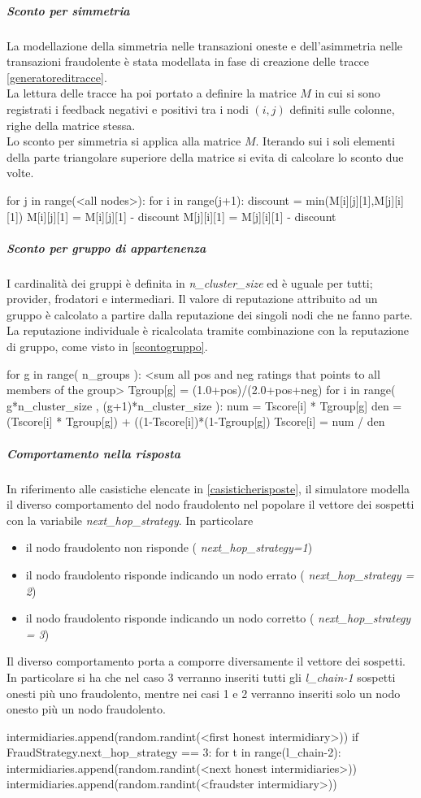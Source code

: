 \subparagraph{Sconto per simmetria}
La modellazione della simmetria nelle transazioni oneste e dell'asimmetria nelle transazioni fraudolente è stata modellata in fase di creazione delle tracce \ref{generatoreditracce}. \\
La lettura delle tracce ha poi portato a definire la matrice $M$ in cui si sono registrati i feedback negativi e positivi tra i nodi $(i,j)$ definiti sulle colonne, righe della matrice stessa.\\
Lo sconto per simmetria si applica alla matrice $M$. Iterando sui i soli elementi della parte triangolare superiore della matrice si evita di calcolare lo sconto due volte.
\begin{python}
for j in range(<all nodes>):
	for i in range(j+1):
		discount = min(M[i][j][1],M[j][i][1])
		M[i][j][1] = M[i][j][1] - discount
		M[j][i][1] = M[j][i][1] - discount
\end{python}

\subparagraph{Sconto per gruppo di appartenenza}
I cardinalità dei gruppi è definita in \emph{n\_cluster\_size} ed è uguale per tutti; provider, frodatori e intermediari.
Il valore di reputazione attribuito ad un gruppo è calcolato a partire dalla reputazione dei singoli nodi che ne fanno parte. 
La reputazione individuale è ricalcolata tramite combinazione con la reputazione di gruppo, come visto in \ref{scontogruppo}.
\begin{python}
 for g in range( n_groups ):
	<sum all pos and neg ratings that points to all members of the group>
	Tgroup[g] = (1.0+pos)/(2.0+pos+neg)
	for i in range( g*n_cluster_size , (g+1)*n_cluster_size ):
		num = Tscore[i] * Tgroup[g]
		den = (Tscore[i] * Tgroup[g]) + ((1-Tscore[i])*(1-Tgroup[g])
		Tscore[i] = num  / den
\end{python}




\subparagraph{Comportamento nella risposta}
In riferimento alle casistiche elencate in \ref{casisticherisposte}, il simulatore modella il diverso comportamento del nodo fraudolento nel popolare il vettore dei sospetti con la variabile \emph{next\_hop\_strategy}. In particolare
\begin{itemize}
\item il nodo fraudolento non risponde ( \emph{next\_hop\_strategy=1})
\item  il nodo fraudolento risponde indicando un nodo errato ( \emph{next\_hop\_strategy = 2})
\item  il nodo fraudolento risponde indicando un nodo corretto ( \emph{next\_hop\_strategy = 3})
\end{itemize}
Il diverso comportamento porta a comporre diversamente il vettore dei sospetti. In particolare si ha che nel caso 3 verranno inseriti tutti gli \emph{l\_chain-1} sospetti onesti più uno fraudolento, mentre nei casi 1 e 2 verranno inseriti solo un nodo onesto più un nodo fraudolento.
\begin{python}
intermidiaries.append(random.randint(<first honest intermidiary>))
	if FraudStrategy.next_hop_strategy == 3: 
		for t in range(l_chain-2):
			intermidiaries.append(random.randint(<next honest intermidiaries>))
		intermidiaries.append(random.randint(<fraudster intermidiary>))
\end{python}


